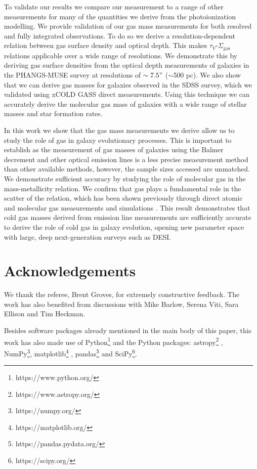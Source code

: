 \documentclass[fleqn,usenatbib]{mnras}
\begin{document}
To validate our results we compare our measurement to a range of other measurements for many of the quantities we derive from the photoionization modelling. We provide validation of our gas mass measurements for both resolved and fully integrated observations. To do so we derive a resolution-dependent relation between gas surface density and optical depth. This makes $\tau_{V}$-$\Sigma_{\textrm{gas}}$ relations applicable over a wide range of resolutions. We demonstrate this by deriving gas surface densities from the optical depth measurements of galaxies in the PHANGS-MUSE survey at resolutions of $\sim7.5"$ ($\sim$500 pc). We also show that we can derive gas masses for galaxies observed in the SDSS survey, which we validated using xCOLD GASS direct measurements. Using this technique we can accurately derive the molecular gas mass of galaxies with a wide range of stellar masses and star formation rates. 

In this work we show that the gas mass measurements we derive allow us to study the role of gas in galaxy evolutionary processes. This is important to establish as the measurement of gas masses of galaxies using the Balmer decrement and other optical emission lines is a less precise measurement method than other available methods, however, the sample sizes accessed are unmatched. We demonstrate sufficient accuracy by studying the role of molecular gas in the mass-metallicity relation. We confirm that gas plays a fundamental role in the scatter of the relation, which has been shown previously through direct atomic and molecular gas measurements and simulations \citep[e.g.][]{bothwell2013, bothwell2016, loon2021}. This result demonstrates that cold gas masses derived from emission line measurements are sufficiently accurate to derive the role of cold gas in galaxy evolution, opening new parameter space with large, deep next-generation surveys such as DESI. 


\section*{Acknowledgements}
We thank the referee, Brent Groves, for extremely constructive feedback. The work has also benefited from discussions with Mike Barlow, Serena Viti, Sara Ellison and Tim Heckman. 

Besides software packages already mentioned in the main body of this paper, this work has also made use of Python\footnote{https://www.python.org/} and the Python packages: astropy\footnote{https://www.astropy.org/} \citep{astropy2013}, NumPy\footnote{https://numpy.org/}, matplotlib\footnote{https://matplotlib.org/} \citep{hunter2007}, pandas\footnote{https://pandas.pydata.org/} \citep{reback2020} and SciPy\footnote{https://scipy.org/}.
\end{document}
